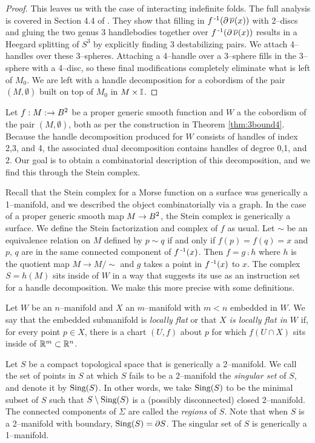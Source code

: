 \begin{proof}
	This leaves us with the case of interacting indefinite folds.
	The full analysis is covered in Section 4.4 of \cite{CostThur08}.
	They show that filling in $f^{\,\text{-}1}(\partial\,\overline{\nu}(x))$ with 2--discs and gluing the two genus 3 handlebodies together over $f^{\,\text{-}1}(\partial\,\overline{\nu}(x))$ results in a Heegard splitting of $S^3$ by explicitly finding 3 destabilizing pairs.
	We attach 4--handles over these 3--spheres.
	Attaching a 4--handle over a 3--sphere fills in the 3--sphere with a 4--disc, so these final modifications completely eliminate what is left of $M_0$.
	We are left with a handle decomposition for a cobordism of the pair $(M,\emptyset)$ built on top of $M_0$ in $M\times\mathbb{I}$.
\end{proof}

Let $f:M:\to B^2$ be a proper generic smooth function and $W$ a the cobordism of the pair $(M,\emptyset)$, both as per the construction in Theorem \ref{thm:3bound4}. 
Because the handle decomposition produced for $W$ consists of handles of index 2,3, and 4, the associated dual decomposition contains handles of degree 0,1, and 2.
Our goal is to obtain a combinatorial description of this decomposition, and we find this through the Stein complex.

Recall that the Stein complex for a Morse function on a surface was generically a 1--manifold, and we described the object combinatorially via a graph.
In the case of a proper generic smooth map $M\to B^2$, the Stein complex is generically a surface.
We define the Stein factorization and complex of $f$ as usual.
Let $\sim$ be an equivalence relation on $M$ defined by $p\sim q$ if and only if $f(p)=f(q)=x$ and $p$, $q$ are in the same connected component of $f^{\,\text{-}1}(x)$.
Then $f=g\comp h$ where $h$ is the quotient map $M\to M/\!\!\sim$ and $g$ takes a point in $f^{\,\text{-}1}(x)$ to $x$.
The complex $S=h(M)$ sits inside of $W$ in a way that suggests its use as an instruction set for a handle decomposition.
We make this more precise with some definitions.

\begin{defn}
	Let $W$ be an $n$--manifold and $X$ an $m$--manifold with $m<n$ embedded in $W$.
	We say that the embedded submanifold is \emph{locally flat} or that \emph{$X$ is locally flat in $W$} if, for every point $p\in X$, there is a chart $(U,f)$ about $p$ for which $f(U\cap X)$ sits inside of $\mathbb{R}^m\subset \mathbb{R}^n$.
\end{defn}

\begin{defn}
	Let $S$ be a compact topological space that is generically a 2--manifold.
	We call the set of points in $S$ at which $S$ fails to be a 2--manifold the \emph{singular set} of $S$, and denote it by $\textrm{Sing}(S)$.
	In other words, we take $\textrm{Sing}(S)$ to be the minimal subset of $S$ such that $S\setminus\textrm{Sing}(S)$ is a (possibly disconnected) closed 2--manifold.
	The connected components of $\Sigma$ are called the \emph{regions} of $S$.
	Note that when $S$ is a 2--manifold with boundary, $\textrm{Sing}(S)=\partial S$.
	The singular set of $S$ is generically a 1--manifold.
\end{defn}

